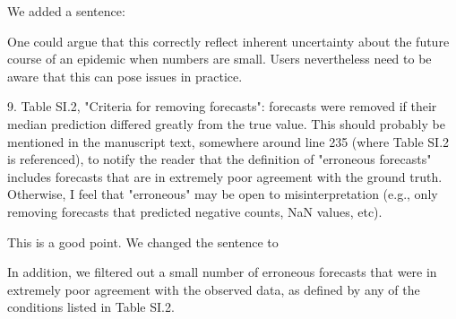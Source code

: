 \documentclass{article}
\newcommand{\black}{\color{black}}
\newcommand{\blue}{\color{blue}}
\begin{document}
\black
We added a sentence: 

One could argue that this correctly reflect inherent uncertainty about the future course of an epidemic when numbers are small. Users nevertheless need to be aware that this can pose issues in practice. 

\blue

9. Table SI.2, "Criteria for removing forecasts": forecasts were removed if their median prediction differed greatly from the true value. This should probably be mentioned in the manuscript text, somewhere around line 235 (where Table SI.2 is referenced), to notify the reader that the definition of "erroneous forecasts" includes forecasts that are in extremely poor agreement with the ground truth. Otherwise, I feel that "erroneous" may be open to misinterpretation (e.g., only removing forecasts that predicted negative counts, NaN values, etc).

\black
This is a good point. We changed the sentence to 

In addition, we filtered out a small number of erroneous forecasts that were in extremely poor agreement with the observed data, as defined by any of the conditions listed in Table SI.2. 







\clearpage

\end{document}
